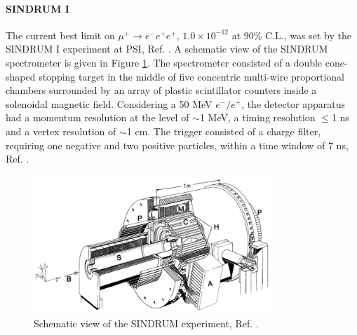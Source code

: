\paragraph{SINDRUM I}
The current best limit on $\mu^+ \rightarrow e^- e^+ e^+$, $1.0 \times 10^{- 12}$ at 90\% C.L., was set by the
SINDRUM I experiment at PSI, Ref. \cite{sindrumi}. A schematic view of the SINDRUM spectrometer is given in Figure \ref{fig:sindrumi}. 
The spectrometer consisted of a double cone-shaped stopping target in the middle of five concentric multi-wire proportional chambers surrounded by an array of plastic
scintillator counters inside a solenoidal magnetic field. Considering a 50 MeV $e^-/e^+$, the detector 
apparatus had a momentum resolution at the level of $\sim$1 MeV, a timing
resolution $\leq$1 ns and a vertex resolution of $\sim$1 cm. The trigger consisted of a charge filter, requiring one negative and two positive particles, within a time window of 7 ns, Ref. \cite{universe8060299}.
\begin{figure}[!h]
\centering
\includegraphics[width =0.8\textwidth]{figures/png/The-SINDRUM-I-detector-in-the-horizontal-operating-orientation.png}
\caption{Schematic view of the SINDRUM experiment, Ref. \cite{sindrumi}.}
\label{fig:sindrumi}
\end{figure}

